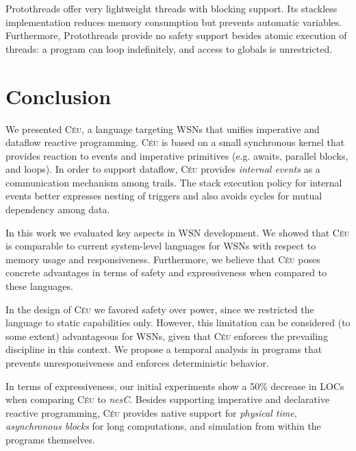 \documentclass{sig-alternate-ipsn09}
\newcommand{\2}{\;\;}
\newcommand{\5}{\;\;\;\;\;}
\newcommand{\CEU}{\textsc{C\'{e}u}}
\newcommand{\nesc}{\emph{nesC}}
\begin{document}
Protothreads \cite{wsn.protothreads} offer very lightweight threads with 
blocking support.
Its stackless implementation reduces memory consumption but prevents automatic 
variables.
Furthermore, Protothreads provide no safety support besides atomic execution of 
threads: a program can loop indefinitely, and access to globals is 
unrestricted.

\section{Conclusion}
\label{sec:conclusion}

We presented \CEU, a language targeting WSNs that unifies imperative and 
dataflow reactive programming.
\CEU{} is based on a small synchronous kernel that provides reaction to events 
and imperative primitives (e.g. awaits, parallel blocks, and loops).
In order to support dataflow, \CEU{} provides \emph{internal events} as a 
communication mechanism among trails.
The stack execution policy for internal events better expresses nesting of 
triggers and also avoids cycles for mutual dependency among data.

In this work we evaluated key aspects in WSN development.
We showed that \CEU{} is comparable to current system-level languages for WSNs 
with respect to memory usage and responsiveness.
Furthermore, we believe that \CEU{} poses concrete advantages in terms of 
safety and expressiveness when compared to these languages.

In the design of \CEU{} we favored safety over power, since we restricted the 
language to static capabilities only.
However, this limitation can be considered (to some extent) advantageous for 
WSNs, given that \CEU{} enforces the prevailing discipline in this context.
We propose a temporal analysis in programs that prevents unresponsiveness and 
enforces deterministic behavior.

In terms of expressiveness, our initial experiments show a 50\% decrease in 
LOCs when comparing \CEU{} to \nesc.
Besides supporting imperative and declarative reactive programming, \CEU{} 
provides native support for \emph{physical time}, \emph{asynchronous blocks} 
for long computations, and simulation from within the programs themselves.
\end{document}
